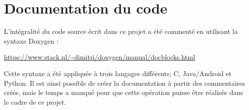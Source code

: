 \section{Documentation du code}

L'intégralité du code source écrit dans ce projet a été commenté en utilisant la syntaxe Doxygen : 

\begin{center}
\url{https://www.stack.nl/~dimitri/doxygen/manual/docblocks.html}
\end{center}

Cette syntaxe a été appliquée à trois langages différents; C, Java/Android et Python. Il est ainsi possible de créer la documentation à partir des commentaires créés, mais le temps a manqué pour que cette opération puisse être réalisée dans le cadre de ce projet.

